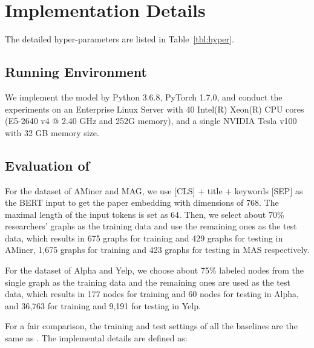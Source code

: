 \section{Implementation Details}
The detailed hyper-parameters are listed in Table~\ref{tbl:hyper}.

\subsection{Running Environment}
We implement the model by Python 3.6.8, PyTorch 1.7.0, and conduct the experiments on an Enterprise Linux Server with 40 Intel(R) Xeon(R) CPU cores (E5-2640 v4 @ 2.40 GHz and 252G memory), and a single NVIDIA Tesla v100 with 32 GB memory size.


\subsection{Evaluation of \model}


 For the dataset of AMiner and MAG, we use [CLS] + title + keywords [SEP] as the BERT input to get the paper embedding with dimensions of 768. The maximal length of the input tokens is set as 64. Then,  we select about 70\% researchers' graphs as the training data and use the remaining ones as the test data, which results in 675 graphs for training and 429 graphs for testing in AMiner, 1,675 graphs for training and 423 graphs for testing in MAS respectively. 

For the dataset of Alpha and Yelp, we choose about 75\% labeled nodes from the single graph as the training data and the remaining ones are used as the test data, which results in 177 nodes for training and 60 nodes for testing in Alpha, and 36,763 for training and 9,191 for testing in Yelp.


For a fair comparison, the training and test settings of all the baselines are the same as \model. The implemental details are defined as:

